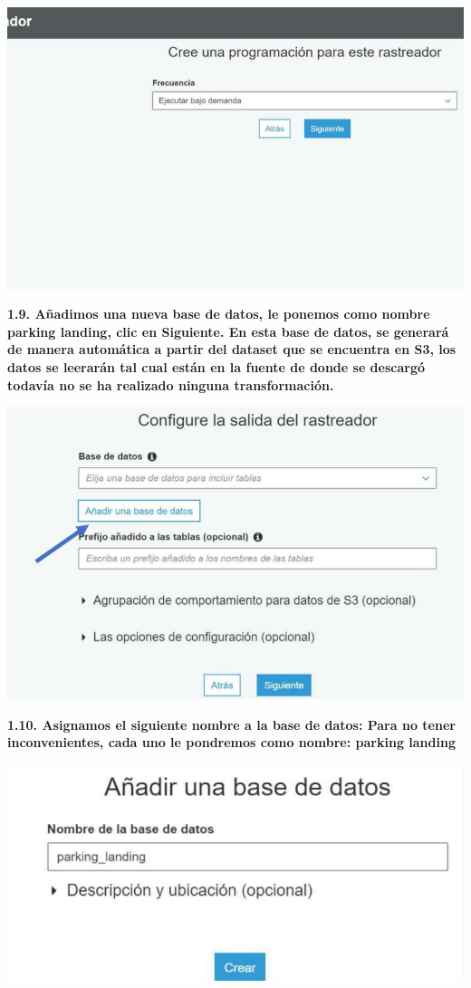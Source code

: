 \documentclass{article}
\begin{document}
    \begin{center}
		\includegraphics[width=15cm]{./images/9} 
	\end{center}
	
	\newpage
\textbf{1.9.   Añadimos una nueva base de datos, le ponemos como nombre parking landing, clic en Siguiente.
En esta base de datos, se generará de manera automática a partir del dataset que se encuentra en S3,
los datos se leerarán tal cual están en la fuente de donde se descargó todavía no se ha realizado
ninguna transformación.
}

    \begin{center}
		\includegraphics[width=15cm]{./images/10} 
	\end{center}
	
		
	\newpage
\textbf{1.10.  Asignamos el siguiente nombre a la base de datos:
Para no tener inconvenientes, cada uno le pondremos como nombre:
parking landing
}

    \begin{center}
		\includegraphics[width=15cm]{./images/11} 
	\end{center}
	
\end{document}
